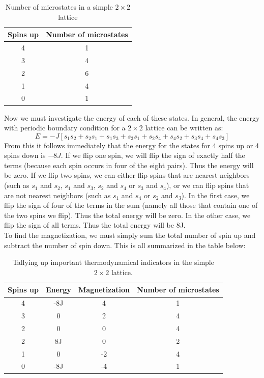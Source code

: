 \documentclass[a4paper, 10pt]{article}
\begin{document}
\begin{table}[!hb]
\centering
\caption{Number of microstates in a simple $2 \times 2$ lattice}
\begin{tabular}{|c|c|}
\hline
Spins up & Number of microstates\\
\hline
4 & 1\\
3 & 4\\
2 & 6\\
1 & 4\\
0 & 1\\
\hline
\end{tabular}
\end{table}
\linebreak
Now we must investigate the energy of each of these states. In general, the energy with periodic boundary condition for a $2\times 2$ lattice can be written as:
$$E=-J\left[s_1s_2+s_2s_1+s_1s_3+s_3s_1+s_2s_4+s_4s_2+s_3s_4+s_4s_3\right]$$
From this it follows immediately that the energy for the states for 4 spins up or 4 spins down is $-8J$. If we flip one spin, we will flip the sign of exactly half the terms (because each spin occurs in four of the eight pairs). Thus the energy will be zero. If we flip two spins, we can either flip spins that are nearest neighbors (such as $s_1$ and $s_2$, $s_1$ and $s_3$, $s_2$ and $s_4$ or $s_3$ and $s_4$), or we can flip spins that are not nearest neighbors (such as $s_1$ and $s_4$ or $s_2$ and $s_3$). In the first case, we flip the sign of four of the terms in the sum (namely all those that contain one of the two  spins we flip). Thus the total energy will be zero. In the other case, we flip the sign of all terms. Thus the total energy will be 8J.\\
\linebreak
To find the magnetization, we must simply sum the total number of spin up and subtract the number of spin down. This is all summarized in the table below:\\
\begin{table}[!ht]
\centering
\caption{Tallying up important thermodynamical indicators in the simple $2 \times 2$ lattice.}
\begin{tabular}{|c|c|c|c|}
\hline
Spins up &  Energy & Magnetization &Number of microstates\\
\hline
4 &-8J&4&1\\
3 &0 & 2 & 4\\
2 &0 &0 & 4\\
2 & 8J & 0 &2\\
1 &0&-2 & 4\\
0 & -8J & -4& 1\\
\hline
\end{tabular}
\end{table}
\end{document}
